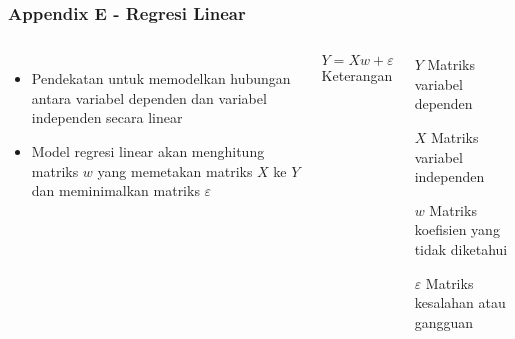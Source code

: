 \documentclass[8pt]{beamer}
\begin{document}
\begin{frame}
  \frametitle{Appendix E - Regresi Linear}
  \begin{columns}[T]
    \begin{itemize}
      \item Pendekatan untuk memodelkan hubungan antara variabel dependen dan variabel independen secara linear
      \item Model regresi linear akan menghitung matriks $w$ yang memetakan matriks $X$ ke $Y$ dan meminimalkan matriks $\varepsilon$ 
    \end{itemize}
    \begin{equation}
      \label{eq:reglinear}
      Y = Xw + \varepsilon
    \end{equation}
    \center Keterangan
    \begin{description}
      \item{$Y$} Matriks variabel dependen
      \item{$X$} Matriks variabel independen
      \item{$w$} Matriks koefisien yang tidak diketahui
      \item{$\varepsilon$} Matriks kesalahan atau gangguan
    \end{description}
  \end{columns}
\end{frame}
\end{document}
